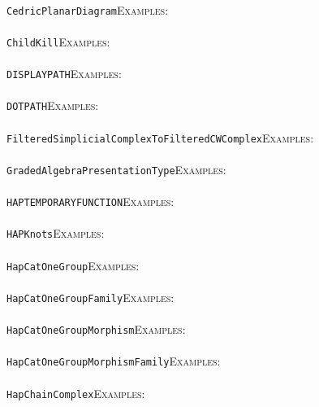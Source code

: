 \documentclass[a4paper,11pt]{report}
\begin{document}
{{ \\
 \texttt{Cedric{\textunderscore}PlanarDiagram}{\nobreakspace}{\nobreakspace}{\nobreakspace}{\nobreakspace}\textsc{Examples:} \\
 \\
 \texttt{ChildKill}{\nobreakspace}{\nobreakspace}{\nobreakspace}{\nobreakspace}\textsc{Examples:} \\
 \\
 \texttt{DISPLAY{\textunderscore}PATH}{\nobreakspace}{\nobreakspace}{\nobreakspace}{\nobreakspace}\textsc{Examples:} \\
 \\
 \texttt{DOT{\textunderscore}PATH}{\nobreakspace}{\nobreakspace}{\nobreakspace}{\nobreakspace}\textsc{Examples:} \\
 \\
 \texttt{FilteredSimplicialComplexToFilteredCWComplex}{\nobreakspace}{\nobreakspace}{\nobreakspace}{\nobreakspace}\textsc{Examples:} \\
 \\
 \texttt{GradedAlgebraPresentationType}{\nobreakspace}{\nobreakspace}{\nobreakspace}{\nobreakspace}\textsc{Examples:} \\
 \\
 \texttt{HAPTEMPORARYFUNCTION}{\nobreakspace}{\nobreakspace}{\nobreakspace}{\nobreakspace}\textsc{Examples:} \\
 \\
 \texttt{HAP{\textunderscore}Knots}{\nobreakspace}{\nobreakspace}{\nobreakspace}{\nobreakspace}\textsc{Examples:} \\
 \\
 \texttt{HapCatOneGroup}{\nobreakspace}{\nobreakspace}{\nobreakspace}{\nobreakspace}\textsc{Examples:} \\
 \\
 \texttt{HapCatOneGroupFamily}{\nobreakspace}{\nobreakspace}{\nobreakspace}{\nobreakspace}\textsc{Examples:} \\
 \\
 \texttt{HapCatOneGroupMorphism}{\nobreakspace}{\nobreakspace}{\nobreakspace}{\nobreakspace}\textsc{Examples:} \\
 \\
 \texttt{HapCatOneGroupMorphismFamily}{\nobreakspace}{\nobreakspace}{\nobreakspace}{\nobreakspace}\textsc{Examples:} \\
 \\
 \texttt{HapChainComplex}{\nobreakspace}{\nobreakspace}{\nobreakspace}{\nobreakspace}\textsc{Examples:} \\
}}
\end{document}
